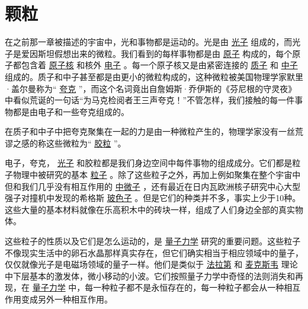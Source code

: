 	\chapter{颗粒}
\indent

    在之前那一章被描述的宇宙中，光和事物都是运动的。光是由
\href{http://toyhouse.cc/wiki/index.php/光子}{光子}
组成的，而光子是爱因斯坦假想出来的微粒。我们看到的每样事物都是由
\href{http://toyhouse.cc/wiki/index.php/原子}{原子}
构成的，每个原子都包含着
\href{http://toyhouse.cc/wiki/index.php/原子核}{原子核}
和核外
\href{http://toyhouse.cc/wiki/index.php/电子}{电子}
。每一个原子核又是由紧密连接的
\href{http://toyhouse.cc/wiki/index.php/质子}{质子}
和
\href{http://toyhouse.cc/wiki/index.php/中子}{中子}
组成的。质子和中子甚至都是由更小的微粒构成的，这种微粒被美国物理学家默里·盖尔曼称为“
\href{http://toyhouse.cc/wiki/index.php/夸克}{夸克}
”，而这个名词竟出自詹姆斯·乔伊斯的《芬尼根的守灵夜》中看似荒诞的一句话“为马克检阅者王三声夸克！”不管怎样，我们接触的每一件事物都是由电子和一些夸克组成的。
 
    在质子和中子中把夸克聚集在一起的力是由一种微粒产生的，物理学家没有一丝荒谬之感的称这些微粒为“
\href{http://toyhouse.cc/wiki/index.php/胶粒}{胶粒}
”。

     电子，夸克，
\href{http://toyhouse.cc/wiki/index.php/光子}{光子}
和胶粒都是我们身边空间中每件事物的组成成分。它们都是粒子物理中被研究的基本
\href{http://toyhouse.cc/wiki/index.php/粒子}{粒子}
。除了这些粒子之外，再加上例如聚集在整个宇宙中但和我们几乎没有相互作用的
\href{http://toyhouse.cc/wiki/index.php/中微子}{中微子}
，还有最近在日内瓦欧洲核子研究中心大型强子对撞机中发现的希格斯
\href{http://toyhouse.cc/wiki/index.php/玻色子}{玻色子}
。但是它们的种类并不多，事实上少于10种。这些大量的基本材料就像在乐高积木中的砖块一样，组成了人们身边全部的真实物体。

     这些粒子的性质以及它们是怎么运动的，是
\href{http://toyhouse.cc/wiki/index.php/量子力学}{量子力学}
研究的重要问题。这些粒子不像现实生活中的卵石水晶那样真实存在，但它们确实相当于相应领域中的量子，仅仅就像光子是电磁场领域的量子一样。他们是类似于
\href{http://toyhouse.cc/wiki/index.php/法拉第}{法拉第}
和
\href{http://toyhouse.cc/wiki/index.php/麦克斯韦}{麦克斯韦}
理论中下层基本的激发体，微小移动的小波。它们按照量子力学中奇怪的法则消失和再现，在
\href{http://toyhouse.cc/wiki/index.php/量子力学}{量子力学}
中，每一种粒子都不是永恒存在的，每一种粒子都会从一种相互作用变成另外一种相互作用。

